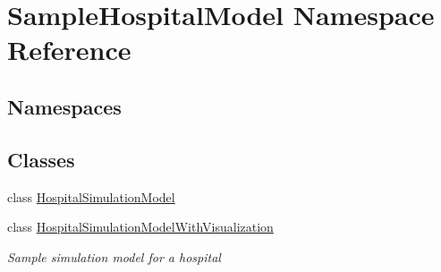 \hypertarget{namespace_sample_hospital_model}{}\section{Sample\+Hospital\+Model Namespace Reference}
\label{namespace_sample_hospital_model}
\subsection*{Namespaces}
\begin{DoxyCompactItemize}
\end{DoxyCompactItemize}
\subsection*{Classes}
\begin{DoxyCompactItemize}
\item 
class \hyperlink{class_sample_hospital_model_1_1_hospital_simulation_model}{Hospital\+Simulation\+Model}
\item 
class \hyperlink{class_sample_hospital_model_1_1_hospital_simulation_model_with_visualization}{Hospital\+Simulation\+Model\+With\+Visualization}
\begin{DoxyCompactList}\small\item\em Sample simulation model for a hospital \end{DoxyCompactList}\end{DoxyCompactItemize}
